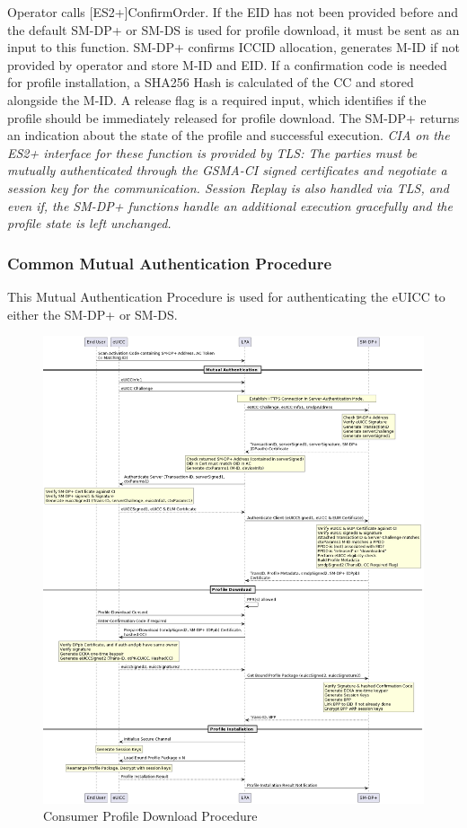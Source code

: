 Operator calls [ES2+]ConfirmOrder. If the EID has not been provided before and the default SM-DP+ or SM-DS is used for profile download, it must be sent as an input to this function. SM-DP+ confirms ICCID allocation, generates M-ID if not provided by operator and store M-ID and EID. If a confirmation code is needed for profile installation, a SHA256 Hash is calculated of the CC and stored alongside the M-ID. A release flag is a required input, which identifies if the profile should be immediately released for profile download. The SM-DP+ returns an indication about the state of the profile and successful execution.
\textit{CIA on the ES2+ interface for these function is provided by TLS: The parties must be mutually authenticated through the GSMA-CI signed certificates and negotiate a session key for the communication. Session Replay is also handled via TLS, and even if, the SM-DP+ functions handle an additional execution gracefully and the profile state is left unchanged.}

\subsubsection{Common Mutual Authentication Procedure}
This Mutual Authentication Procedure is used for authenticating the eUICC to either the SM-DP+ or SM-DS. 
\begin{figure}
    \centering
    \includegraphics[width=.95\textwidth]{pictures/consumer_profile_download.png}
    \caption{Consumer Profile Download Procedure}
    \label{fig:ConMutAuth}
\end{figure}

